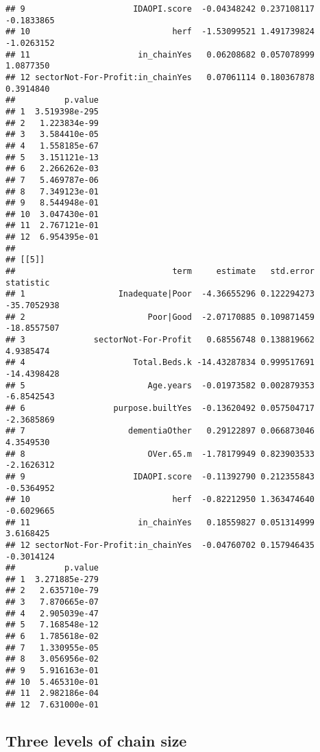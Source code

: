 \documentclass[]{article}
\newenvironment{Shaded}{\begin{snugshade}}{\end{snugshade}}
\newcommand{\KeywordTok}[1]{\textcolor[rgb]{0.13,0.29,0.53}{\textbf{{#1}}}}
\newcommand{\DataTypeTok}[1]{\textcolor[rgb]{0.13,0.29,0.53}{{#1}}}
\newcommand{\StringTok}[1]{\textcolor[rgb]{0.31,0.60,0.02}{{#1}}}
\newcommand{\OtherTok}[1]{\textcolor[rgb]{0.56,0.35,0.01}{{#1}}}
\newcommand{\NormalTok}[1]{{#1}}
\begin{document}
\begin{verbatim}
## 9                      IDAOPI.score  -0.04348242 0.237108117  -0.1833865
## 10                             herf  -1.53099521 1.491739824  -1.0263152
## 11                      in_chainYes   0.06208682 0.057078999   1.0877350
## 12 sectorNot-For-Profit:in_chainYes   0.07061114 0.180367878   0.3914840
##          p.value
## 1  3.519398e-295
## 2   1.223834e-99
## 3   3.584410e-05
## 4   1.558185e-67
## 5   3.151121e-13
## 6   2.266262e-03
## 7   5.469787e-06
## 8   7.349123e-01
## 9   8.544948e-01
## 10  3.047430e-01
## 11  2.767121e-01
## 12  6.954395e-01
## 
## [[5]]
##                                term     estimate   std.error   statistic
## 1                   Inadequate|Poor  -4.36655296 0.122294273 -35.7052938
## 2                         Poor|Good  -2.07170885 0.109871459 -18.8557507
## 3              sectorNot-For-Profit   0.68556748 0.138819662   4.9385474
## 4                      Total.Beds.k -14.43287834 0.999517691 -14.4398428
## 5                         Age.years  -0.01973582 0.002879353  -6.8542543
## 6                  purpose.builtYes  -0.13620492 0.057504717  -2.3685869
## 7                     dementiaOther   0.29122897 0.066873046   4.3549530
## 8                         OVer.65.m  -1.78179949 0.823903533  -2.1626312
## 9                      IDAOPI.score  -0.11392790 0.212355843  -0.5364952
## 10                             herf  -0.82212950 1.363474640  -0.6029665
## 11                      in_chainYes   0.18559827 0.051314999   3.6168425
## 12 sectorNot-For-Profit:in_chainYes  -0.04760702 0.157946435  -0.3014124
##          p.value
## 1  3.271885e-279
## 2   2.635710e-79
## 3   7.870665e-07
## 4   2.905039e-47
## 5   7.168548e-12
## 6   1.785618e-02
## 7   1.330955e-05
## 8   3.056956e-02
## 9   5.916163e-01
## 10  5.465310e-01
## 11  2.982186e-04
## 12  7.631000e-01
\end{verbatim}

\subsection{Three levels of chain
size}\label{three-levels-of-chain-size}

\begin{Shaded}
\end{Shaded}
\end{document}
